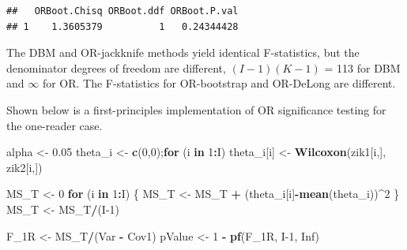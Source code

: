 \documentclass[
]{book}
\newenvironment{Shaded}{\begin{snugshade}}{\end{snugshade}}
\newcommand{\ControlFlowTok}[1]{\textcolor[rgb]{0.13,0.29,0.53}{\textbf{#1}}}
\newcommand{\DecValTok}[1]{\textcolor[rgb]{0.00,0.00,0.81}{#1}}
\newcommand{\FloatTok}[1]{\textcolor[rgb]{0.00,0.00,0.81}{#1}}
\newcommand{\KeywordTok}[1]{\textcolor[rgb]{0.13,0.29,0.53}{\textbf{#1}}}
\newcommand{\NormalTok}[1]{#1}
\newcommand{\OperatorTok}[1]{\textcolor[rgb]{0.81,0.36,0.00}{\textbf{#1}}}
\newcommand{\OtherTok}[1]{\textcolor[rgb]{0.56,0.35,0.01}{#1}}
\newcommand{\StringTok}[1]{\textcolor[rgb]{0.31,0.60,0.02}{#1}}
\begin{document}
\begin{verbatim}
##   ORBoot.Chisq ORBoot.ddf ORBoot.P.val
## 1    1.3605379          1   0.24344428
\end{verbatim}

The DBM and OR-jackknife methods yield identical F-statistics, but the denominator degrees of freedom are different, \((I-1)(K-1)\) = 113 for DBM and \(\infty\) for OR. The F-statistics for OR-bootstrap and OR-DeLong are different.

Shown below is a first-principles implementation of OR significance testing for the one-reader case.

\begin{Shaded}
\begin{Highlighting}[]
\NormalTok{alpha <-}\StringTok{ }\FloatTok{0.05}
\NormalTok{theta_i <-}\StringTok{ }\KeywordTok{c}\NormalTok{(}\DecValTok{0}\NormalTok{,}\DecValTok{0}\NormalTok{);}\ControlFlowTok{for}\NormalTok{ (i }\ControlFlowTok{in} \DecValTok{1}\OperatorTok{:}\NormalTok{I) theta_i[i] <-}\StringTok{ }\KeywordTok{Wilcoxon}\NormalTok{(zik1[i,], zik2[i,])}

\NormalTok{MS_T <-}\StringTok{ }\DecValTok{0}
\ControlFlowTok{for}\NormalTok{ (i }\ControlFlowTok{in} \DecValTok{1}\OperatorTok{:}\NormalTok{I) \{}
\NormalTok{  MS_T <-}\StringTok{ }\NormalTok{MS_T }\OperatorTok{+}\StringTok{ }\NormalTok{(theta_i[i]}\OperatorTok{-}\KeywordTok{mean}\NormalTok{(theta_i))}\OperatorTok{^}\DecValTok{2}
\NormalTok{\}}
\NormalTok{MS_T <-}\StringTok{ }\NormalTok{MS_T}\OperatorTok{/}\NormalTok{(I}\DecValTok{-1}\NormalTok{)}

\NormalTok{F_1R <-}\StringTok{ }\NormalTok{MS_T}\OperatorTok{/}\NormalTok{(Var }\OperatorTok{-}\StringTok{ }\NormalTok{Cov1)}
\NormalTok{pValue <-}\StringTok{ }\DecValTok{1} \OperatorTok{-}\StringTok{ }\KeywordTok{pf}\NormalTok{(F_1R, I}\DecValTok{-1}\NormalTok{, }\OtherTok{Inf}\NormalTok{)}


\end{Highlighting}
\end{Shaded}
\end{document}
